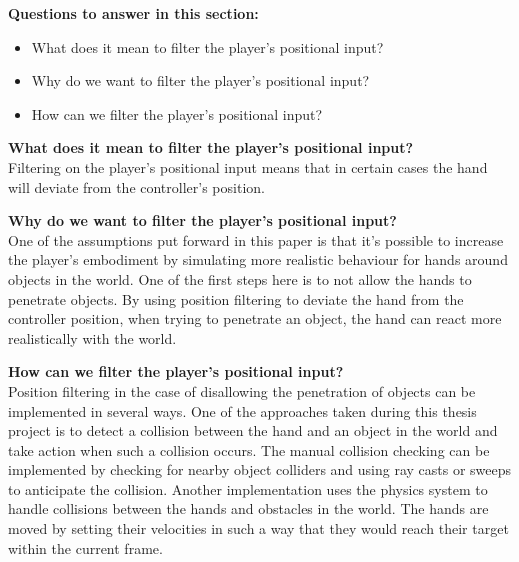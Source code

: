 \textbf{Questions to answer in this section:}
\begin{itemize}
\item What does it mean to filter the player's positional input?
\item Why do we want to filter the player's positional input?
\item How can we filter the player's positional input?
\end{itemize}


\textbf{What does it mean to filter the player's positional input?}\\
Filtering on the player's positional input means that in certain cases the hand will deviate from the controller's position.

\textbf{Why do we want to filter the player's positional input?}\\
One of the assumptions put forward in this paper is that it's possible to increase the player's embodiment by simulating more realistic behaviour for hands around objects in the world. One of the first steps here is to not allow the hands to penetrate objects. By using position filtering to deviate the hand from the controller position, when trying to penetrate an object, the hand can react more realistically with the world.

\textbf{How can we filter the player's positional input?}\\
Position filtering in the case of disallowing the penetration of objects can be implemented in several ways. One of the approaches taken during this thesis project is to detect a collision between the hand and an object in the world and take action when such a collision occurs. The manual collision checking can be implemented by checking for nearby object colliders and using ray casts or sweeps to anticipate the collision.
Another implementation uses the physics system to handle collisions between the hands and obstacles in the world. The hands are moved by setting their velocities in such a way that they would reach their target within the current frame.



